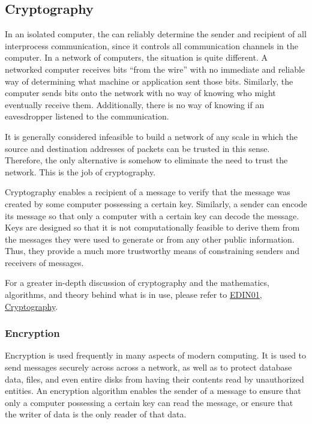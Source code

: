 \subsection{Cryptography}\label{subsec:Cryptography}
In an isolated computer, the  can reliably determine the sender and recipient of all interprocess communication, since it controls all communication channels in the computer.
In a network of computers, the situation is quite different.
A networked computer receives bits ``from the wire'' with no immediate and reliable way of determining what machine or application sent those bits.
Similarly, the computer sends bits onto the network with no way of knowing who might eventually receive them.
Additionally, there is no way of knowing if an eavesdropper listened to the communication.

It is generally considered infeasible to build a network of any scale in which the source and destination addresses of packets can be trusted in this sense.
Therefore, the only alternative is somehow to eliminate the need to trust the network.
This is the job of cryptography.

Cryptography enables a recipient of a message to verify that the message was created by some computer possessing a certain key.
Similarly, a sender can encode its message so that only a computer with a certain key can decode the message.
Keys are designed so that it is not computationally feasible to derive them from the messages they were used to generate or from any other public information.
Thus, they provide a much more trustworthy means of constraining senders and receivers of messages.

\begin{blackbox}
  For a greater in-depth discussion of cryptography and the mathematics, algorithms, and theory behind what is in use, please refer to \href{file:./EDIN01-Cryptography-Reference_Sheet.pdf}{EDIN01, Cryptography}.
\end{blackbox}

\subsubsection{Encryption}\label{subsubsec:Encryption}
Encryption is used frequently in many aspects of modern computing. It is used to send
messages securely across across a network, as well as to protect database data,
files, and even entire disks from having their contents read by unauthorized
entities. An encryption algorithm enables the sender of a message to ensure that
only a computer possessing a certain key can read the message, or ensure that
the writer of data is the only reader of that data.

